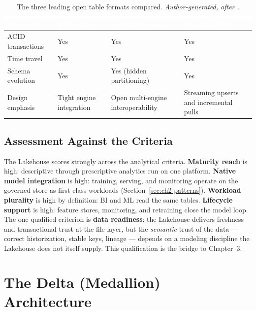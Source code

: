 \begin{table}[H]
\centering
\renewcommand{\arraystretch}{1.35}
\caption{The three leading open table formats compared. \textit{Author-generated, after \parencite{deltalake2020, armbrust2021}.}}
\label{tab:otf}
\begin{tabularx}{\linewidth}{|>{\raggedright\arraybackslash}p{2.6cm}|>{\raggedright\arraybackslash}X|>{\raggedright\arraybackslash}X|>{\raggedright\arraybackslash}X|}
\hline
\rowcolor{tblheader}
\textcolor{white}{\textbf{Property}} &
\textcolor{white}{\textbf{Delta Lake}} &
\textcolor{white}{\textbf{Apache Iceberg}} &
\textcolor{white}{\textbf{Apache Hudi}} \\
\hline
ACID transactions & Yes & Yes & Yes \\
Time travel & Yes & Yes & Yes \\
Schema evolution & Yes & Yes (hidden partitioning) & Yes \\
Design emphasis & Tight engine integration & Open multi-engine interoperability & Streaming upserts and incremental pulls \\
\hline
\end{tabularx}
\end{table}

\subsection{Assessment Against the Criteria}
\label{subsec:ch2-lakehouse-assess}

The Lakehouse scores strongly across the analytical criteria. \textbf{Maturity reach} is high: descriptive through prescriptive analytics run on one platform. \textbf{Native model integration} is high: training, serving, and monitoring operate on the governed store as first-class workloads (Section~\ref{sec:ch2-patterns}). \textbf{Workload plurality} is high by definition: BI and ML read the same tables. \textbf{Lifecycle support} is high: feature stores, monitoring, and retraining close the model loop. The one qualified criterion is \textbf{data readiness}: the Lakehouse delivers freshness and transactional trust at the file layer, but the \textit{semantic} trust of the data --- correct historization, stable keys, lineage --- depends on a modeling discipline the Lakehouse does not itself supply. This qualification is the bridge to Chapter~3.

\section{The Delta (Medallion) Architecture}
\label{sec:ch2-delta}


